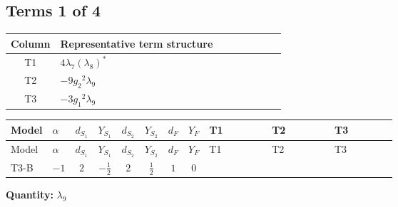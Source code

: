\documentclass[8pt]{article}
\begin{document}
\begin{landscape}
\subsection*{Terms 1 of 4}
\begin{center}
\begin{tabular}{@{}c >{\raggedright\arraybackslash}p{0.82\linewidth}@{}}
\toprule
Column & Representative term structure \\
\midrule
T1 & \(\displaystyle 4 {\lambda_{7}} \left({\lambda_{8}}\right)^{*}\) \\
\midrule
T2 & \(\displaystyle -9 {g_2}^2 {\lambda_{9}}\) \\
\midrule
T3 & \(\displaystyle -3 {g_1}^2 {\lambda_{9}}\) \\
\midrule
\bottomrule
\end{tabular}
\end{center}
\smallskip
\tiny
\begin{longtable}{@{}llcccccc >{\raggedright\arraybackslash}p{0.21\linewidth} >{\raggedright\arraybackslash}p{0.21\linewidth} >{\raggedright\arraybackslash}p{0.21\linewidth}@{}}
\toprule
Model & $\alpha$ & $d_{S_1}$ & $Y_{S_1}$ & $d_{S_2}$ & $Y_{S_2}$ & $d_F$ & $Y_F$ & T1 & T2 & T3 \\
\midrule
\endfirsthead
\toprule
Model & $\alpha$ & $d_{S_1}$ & $Y_{S_1}$ & $d_{S_2}$ & $Y_{S_2}$ & $d_F$ & $Y_F$ & T1 & T2 & T3 \\
\midrule
\endhead
T3-B & $-1$ & $2$ & $-\frac{1}{2}$ & $2$ & $\frac{1}{2}$ & $1$ & $0$ & \scriptsize\adjustbox{max width=\linewidth}{$\begin{gathered} 4 {\lambda_{7}} \left({\lambda_{8}}\right)^{*}\end{gathered}$} & \scriptsize\adjustbox{max width=\linewidth}{$\begin{gathered} -9 {g_2}^2 {\lambda_{9}}\end{gathered}$} & \scriptsize\adjustbox{max width=\linewidth}{$\begin{gathered} -3 {g_1}^2 {\lambda_{9}}\end{gathered}$} \\
\midrule
\bottomrule
\end{longtable}
\clearpage
\noindent\textbf{Quantity: }$\lambda_{9}$\par\smallskip

\end{landscape}
\end{document}
